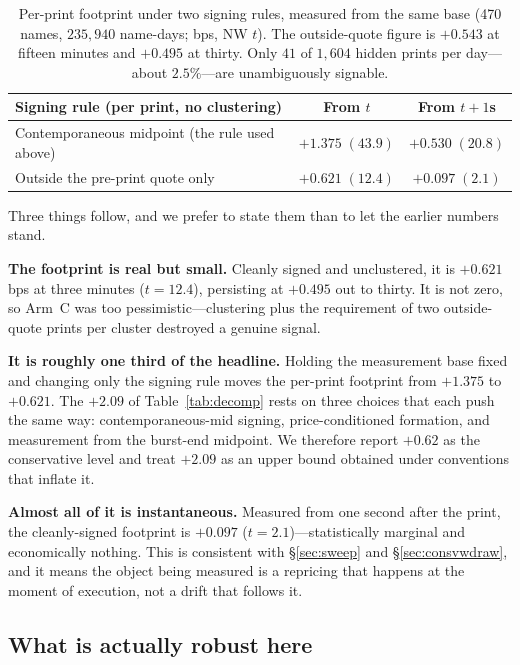 \documentclass[11pt]{article}
\begin{document}
\begin{table}[htbp]
\centering
\begin{tabular}{lcc}
\toprule
\textbf{Signing rule (per print, no clustering)} & \textbf{From $t$} & \textbf{From $t+1$s} \\
\midrule
Contemporaneous midpoint (the rule used above) & $+1.375\;(43.9)$ & $+0.530\;(20.8)$ \\
Outside the pre-print quote only & $+0.621\;(12.4)$ & $+0.097\;(2.1)$ \\
\bottomrule
\end{tabular}
\caption{Per-print footprint under two signing rules, measured from the same base (470 names,
$235{,}940$ name-days; bps, NW $t$). The outside-quote figure is $+0.543$ at fifteen minutes
and $+0.495$ at thirty. Only $41$ of $1{,}604$ hidden prints per day---about $2.5\%$---are
unambiguously signable.}
\label{tab:perprint}
\end{table}

Three things follow, and we prefer to state them than to let the earlier numbers stand.

\textbf{The footprint is real but small.} Cleanly signed and unclustered, it is $+0.621$ bps
at three minutes ($t=12.4$), persisting at $+0.495$ out to thirty. It is not zero, so Arm~C
was too pessimistic---clustering plus the requirement of two outside-quote prints per cluster
destroyed a genuine signal.

\textbf{It is roughly one third of the headline.} Holding the measurement base fixed and
changing only the signing rule moves the per-print footprint from $+1.375$ to $+0.621$. The
$+2.09$ of Table~\ref{tab:decomp} rests on three choices that each push the same way:
contemporaneous-mid signing, price-conditioned formation, and measurement from the burst-end
midpoint. We therefore report $+0.62$ as the conservative level and treat $+2.09$ as an upper
bound obtained under conventions that inflate it.

\textbf{Almost all of it is instantaneous.} Measured from one second after the print, the
cleanly-signed footprint is $+0.097$ ($t=2.1$)---statistically marginal and economically
nothing. This is consistent with \S\ref{sec:sweep} and \S\ref{sec:consvwdraw}, and it means the
object being measured is a repricing that happens at the moment of execution, not a drift
that follows it.

\subsection{What is actually robust here}
\end{document}
